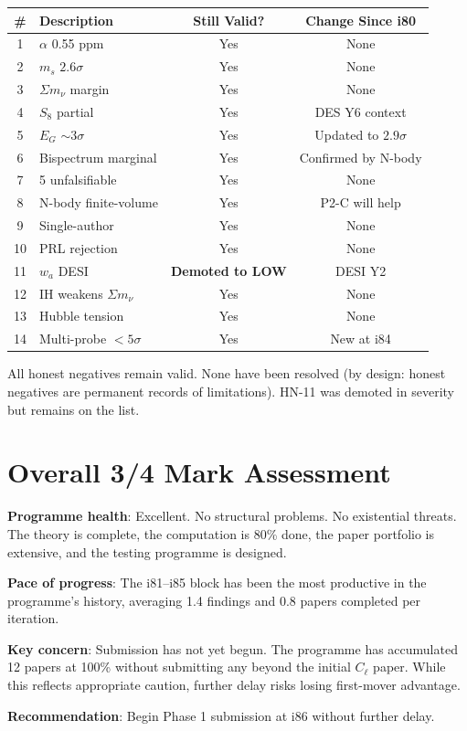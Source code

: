 \documentclass[11pt,a4paper]{article}
\begin{document}
\begin{center}
\begin{tabular}{clcc}
\toprule
\textbf{\#} & \textbf{Description} & \textbf{Still Valid?} & \textbf{Change Since i80} \\
\midrule
1 & $\alpha$ 0.55 ppm & Yes & None \\
2 & $m_s$ $2.6\sigma$ & Yes & None \\
3 & $\Sigma m_\nu$ margin & Yes & None \\
4 & $S_8$ partial & Yes & DES Y6 context \\
5 & $E_G$ $\sim 3\sigma$ & Yes & Updated to $2.9\sigma$ \\
6 & Bispectrum marginal & Yes & Confirmed by N-body \\
7 & 5 unfalsifiable & Yes & None \\
8 & N-body finite-volume & Yes & P2-C will help \\
9 & Single-author & Yes & None \\
10 & PRL rejection & Yes & None \\
11 & $w_a$ DESI & \textbf{Demoted to LOW} & DESI Y2 \\
12 & IH weakens $\Sigma m_\nu$ & Yes & None \\
13 & Hubble tension & Yes & None \\
14 & Multi-probe $< 5\sigma$ & Yes & New at i84 \\
\bottomrule
\end{tabular}
\end{center}

All honest negatives remain valid. None have been resolved (by design: honest negatives are permanent records of limitations). HN-11 was demoted in severity but remains on the list.

\section{Overall 3/4 Mark Assessment}

\textbf{Programme health}: Excellent. No structural problems. No existential threats. The theory is complete, the computation is 80\% done, the paper portfolio is extensive, and the testing programme is designed.

\textbf{Pace of progress}: The i81--i85 block has been the most productive in the programme's history, averaging 1.4 findings and 0.8 papers completed per iteration.

\textbf{Key concern}: Submission has not yet begun. The programme has accumulated 12 papers at 100\% without submitting any beyond the initial $C_\ell$ paper. While this reflects appropriate caution, further delay risks losing first-mover advantage.

\textbf{Recommendation}: Begin Phase 1 submission at i86 without further delay.
\end{document}
